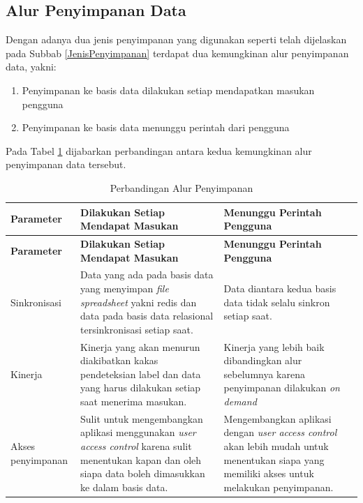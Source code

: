 	\subsection{Alur Penyimpanan Data}
	Dengan adanya dua jenis penyimpanan yang digunakan seperti telah dijelaskan pada Subbab \ref{JenisPenyimpanan} terdapat dua kemungkinan alur penyimpanan data, yakni:
	\begin{enumerate}
		\item Penyimpanan ke basis data dilakukan setiap mendapatkan masukan pengguna
		\item Penyimpanan ke basis data menunggu perintah dari pengguna
	\end{enumerate}

	Pada Tabel \ref{ModelAlurPenyimpanan} dijabarkan perbandingan antara kedua kemungkinan alur penyimpanan data tersebut.

	\begin{small}
	\begin{longtable}{ | p{3cm} | p{4cm} | p{4cm} | }
	    \caption{Perbandingan Alur Penyimpanan}
	    \label{ModelAlurPenyimpanan}\\ \hline
	    \centering\bfseries{Parameter} & \centering\bfseries{Dilakukan Setiap Mendapat Masukan} & \centering\bfseries{Menunggu Perintah Pengguna} \tabularnewline \hline
	    \endfirsthead
	    \hline
	    \centering\bfseries{Parameter} & \centering\bfseries{Dilakukan Setiap Mendapat Masukan} & \centering\bfseries{Menunggu Perintah Pengguna} \tabularnewline \hline
	    \endhead
	    Sinkronisasi & Data yang ada pada basis data yang menyimpan \textit{file spreadsheet} yakni redis dan data pada basis data relasional tersinkronisasi setiap saat. & Data diantara kedua basis data tidak selalu sinkron setiap saat. \\ \hline
	    Kinerja & Kinerja yang akan menurun diakibatkan kakas pendeteksian label dan data yang harus dilakukan setiap saat menerima masukan. & Kinerja yang lebih baik dibandingkan alur sebelumnya karena penyimpanan dilakukan \textit{on demand} \\ \hline
	    Akses penyimpanan & Sulit untuk mengembangkan aplikasi menggunakan \textit{user access control} karena sulit menentukan kapan dan oleh siapa data boleh dimasukkan ke dalam basis data. & Mengembangkan aplikasi dengan \textit{user access control} akan lebih mudah untuk menentukan siapa yang memiliki akses untuk melakukan penyimpanan.\\ \hline
  	\end{longtable}
	\end{small}

